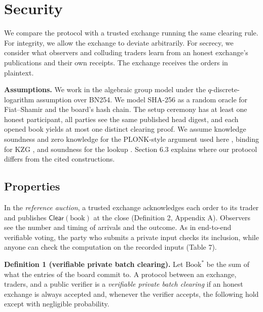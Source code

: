 
\section{Security}

We compare the protocol with a trusted exchange running the same clearing rule. For integrity, we allow the exchange to deviate arbitrarily. For secrecy, we consider what observers and colluding traders learn from an honest exchange's publications and their own receipts. The exchange receives the orders in plaintext.

\textbf{Assumptions.} We work in the algebraic group model under the \(q\)-discrete-logarithm assumption over BN254. We model SHA-256 as a random oracle for Fiat--Shamir and the board's hash chain. The setup ceremony has at least one honest participant, all parties see the same published head digest, and each opened book yields at most one distinct clearing proof. We assume knowledge soundness and zero knowledge for the PLONK-style argument used here \cite{plonk2019,lipmaa2025,sefranek2024}, binding for KZG \cite{kzg2010}, and soundness for the lookup \cite{habock2022}. Section 6.3 explains where our protocol differs from the cited constructions.

\subsection{Properties}

In the \emph{reference auction}, a trusted exchange acknowledges each order to its trader and publishes \(\mathsf{Clear}(\text{book})\) at the close (Definition 2, Appendix A). Observers see the number and timing of arrivals and the outcome. As in end-to-end verifiable voting, the party who submits a private input checks its inclusion, while anyone can check the computation on the recorded inputs (Table 7).

\textbf{Definition 1 (verifiable private batch clearing).} Let \(\text{Book}^*\) be the sum of what the entries of the board commit to. A protocol between an exchange, traders, and a public verifier is a \emph{verifiable private batch clearing} if an honest exchange is always accepted and, whenever the verifier accepts, the following hold except with negligible probability.

